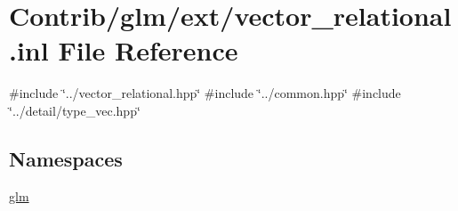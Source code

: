 \hypertarget{vector__relational_8inl}{}\section{Contrib/glm/ext/vector\+\_\+relational.inl File Reference}
\label{vector__relational_8inl}
{\ttfamily \#include \char`\"{}../vector\+\_\+relational.\+hpp\char`\"{}}\newline
{\ttfamily \#include \char`\"{}../common.\+hpp\char`\"{}}\newline
{\ttfamily \#include \char`\"{}../detail/type\+\_\+vec.\+hpp\char`\"{}}\newline
\subsection*{Namespaces}
\begin{DoxyCompactItemize}
\item 
 \mbox{\hyperlink{namespaceglm}{glm}}
\end{DoxyCompactItemize}
